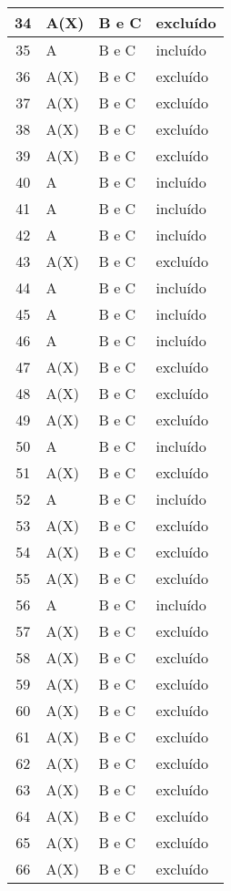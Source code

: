 \documentclass[12pt, a4paper]{article}
\begin{document}
\begin{longtable}{|c|l|l|l|}
		34	&	A(X)&	B e C	& excluído	\\  \hline
		35	&	A	&	B e C	& incluído 	\\  \hline
		36	&	A(X)&	B e C	& excluído 	\\  \hline
		37	&	A(X)&	B e C	& excluído	\\  \hline
		38	&	A(X)&	B e C	& excluído	\\  \hline
		39	&	A(X)&	B e C	& excluído	\\  \hline
		40	&	A	&	B e C	& incluído	\\  \hline
		41	&	A	&	B e C	& incluído	\\  \hline
		42	&	A	&	B e C	& incluído	\\  \hline
		43	&	A(X)&	B e C	& excluído	\\  \hline
		44	&	A	&	B e C	& incluído	\\  \hline
		45	&	A	&	B e C	& incluído	\\  \hline
		46	&	A	&	B e C	& incluído	\\  \hline
		47	&	A(X)&	B e C	& excluído	\\  \hline
		48	&	A(X)&	B e C	& excluído	\\  \hline
		49	&	A(X)&	B e C	& excluído	\\  \hline
		50	&	A	&	B e C	& incluído	\\  \hline
		51	&	A(X)&	B e C	& excluído	\\  \hline
		52	&	A	&	B e C	& incluído	\\	\hline
		53	&	A(X)	&	B e C	& excluído	\\  \hline
		54	&	A(X)	&	B e C	& excluído	\\  \hline
		55	&	A(X)&	B e C	& excluído	\\  \hline
		56	&	A	&	B e C	& incluído	\\  \hline
		57	&	A(X)&	B e C	& excluído	\\  \hline
		58	&	A(X)&	B e C	& excluído	\\  \hline
		59	&	A(X)&	B e C	& excluído	\\  \hline
		60	&	A(X)&	B e C	& excluído	\\  \hline
		61	&	A(X)	&	B e C	& excluído	\\  \hline
		62	&	A(X)	&	B e C	& excluído	\\  \hline
		63	&	A(X)&	B e C	& excluído	\\  \hline
		64	&	A(X)&	B e C	& excluído	\\  \hline
		65	&	A(X)&	B e C	& excluído	\\  \hline
		66	&	A(X)&	B e C	& excluído	\\  \hline

\end{longtable}
\end{document}
